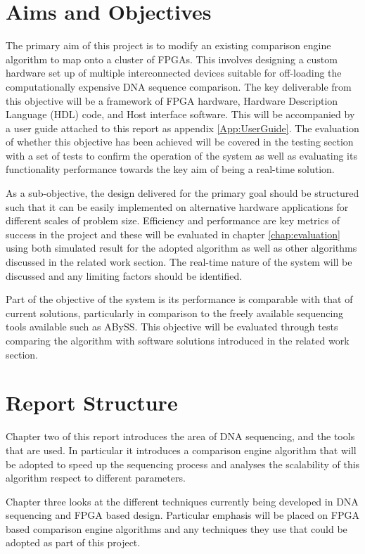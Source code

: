 \section{Aims and Objectives}
The primary aim of this project is to modify an existing comparison engine algorithm to map onto a cluster of FPGAs. This involves designing a custom hardware set up of multiple interconnected devices suitable for off-loading the computationally expensive DNA sequence comparison. The key deliverable from this objective will be a framework of FPGA hardware, Hardware Description Language (HDL) code, and Host interface software. This will be accompanied by a user guide attached to this report as appendix \ref{App:UserGuide}. The evaluation of whether this objective has been achieved will be covered in the testing section with a set of tests to confirm the operation of the system as well as evaluating its functionality performance towards the key aim of being a real-time solution.

As a sub-objective, the design delivered for the primary goal should be structured such that it can be easily implemented on alternative hardware applications for different scales of problem size. Efficiency and performance are key metrics of success in the project and these will be evaluated in chapter \ref{chap:evaluation} using both simulated result for the adopted algorithm as well as other algorithms discussed in the related work section. The real-time nature of the system will be discussed and any limiting factors should be identified.


Part of the objective of the system is its performance is comparable with that of current solutions, particularly in comparison to the freely available sequencing tools available such as ABySS. This objective will be evaluated through tests comparing the algorithm with software solutions introduced in the related work section.

\pagebreak
\section{Report Structure}
Chapter two of this report introduces the area of DNA sequencing, and the tools that are used. In particular it introduces a comparison engine algorithm that will be adopted to speed up the sequencing process and analyses the scalability of this algorithm respect to different parameters. 

Chapter three looks at the different techniques currently being developed in DNA sequencing and FPGA based design. Particular emphasis will be placed on FPGA based comparison engine algorithms and any techniques they use that could be adopted as part of this project. 

